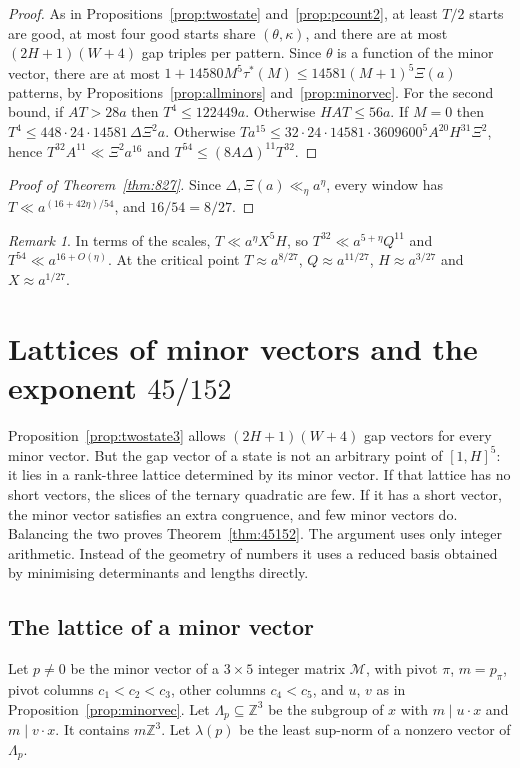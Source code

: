 \documentclass[11pt]{amsart}
\theoremstyle{definition}
\theoremstyle{remark}
\newtheorem{remark}[theorem]{Remark}
\begin{document}
\begin{proof}
As in Propositions~\ref{prop:twostate} and~\ref{prop:pcount2}, at least $T/2$ starts are good, at
most four good starts share $(\theta,\kappa)$, and there are at most $(2H+1)(W+4)$ gap triples per
pattern.
Since $\theta$ is a function of the minor vector, there are at most
$1+14580M^5\tau^*(M)\le14581(M+1)^5\Xi(a)$ patterns, by Propositions~\ref{prop:allminors}
and~\ref{prop:minorvec}. For the second bound, if $AT>28a$ then $T^4\le122449a$. Otherwise
$HAT\le56a$. If $M=0$ then
$T^4\le448\cdot24\cdot14581\,\Delta\Xi^2a$. Otherwise $Ta^{15}\le32\cdot24\cdot14581\cdot3609600^5
A^{20}H^{31}\Xi^2$, hence $T^{32}A^{11}\ll\Xi^2a^{16}$ and $T^{54}\le(8A\Delta)^{11}T^{32}$.
\end{proof}

\begin{proof}[Proof of Theorem~\ref{thm:827}]
Since $\Delta,\Xi(a)\ll_\eta a^\eta$, every window has $T\ll a^{(16+42\eta)/54}$, and $16/54=8/27$.
\end{proof}

\begin{remark}
In terms of the scales, $T\ll a^\eta X^5H$, so $T^{32}\ll a^{5+\eta}Q^{11}$ and $T^{54}\ll
a^{16+O(\eta)}$. At the critical point $T\approx a^{8/27}$, $Q\approx a^{11/27}$, $H\approx a^{3/27}$
and $X\approx a^{1/27}$.
\end{remark}

\section{Lattices of minor vectors and the exponent \texorpdfstring{$45/152$}{45/152}}\label{sec:45152}

Proposition~\ref{prop:twostate3} allows $(2H+1)(W+4)$ gap vectors for every minor vector. But
the gap vector of a state is not an arbitrary point of $[1,H]^5$: it lies in a rank-three
lattice determined by its minor vector. If that lattice has no short vectors, the slices of the
ternary quadratic are few. If it has a short vector, the minor vector satisfies an extra
congruence, and few minor vectors do. Balancing the two proves Theorem~\ref{thm:45152}. The
argument uses only integer arithmetic. Instead of the geometry of numbers it uses a reduced
basis obtained by minimising determinants and lengths directly.

\subsection{The lattice of a minor vector}
Let $p\ne0$ be the minor vector of a $3\times5$ integer matrix $\mathcal M$, with pivot $\pi$,
$m=p_\pi$, pivot columns $c_1<c_2<c_3$, other columns $c_4<c_5$, and $u$, $v$ as in
Proposition~\ref{prop:minorvec}. Let $\Lambda_p\subseteq\mathbb Z^3$ be the subgroup of $x$ with
$m\mid u\cdot x$ and $m\mid v\cdot x$. It contains $m\mathbb Z^3$. Let $\lambda(p)$ be the least
sup-norm of a nonzero vector of $\Lambda_p$.
\end{document}
